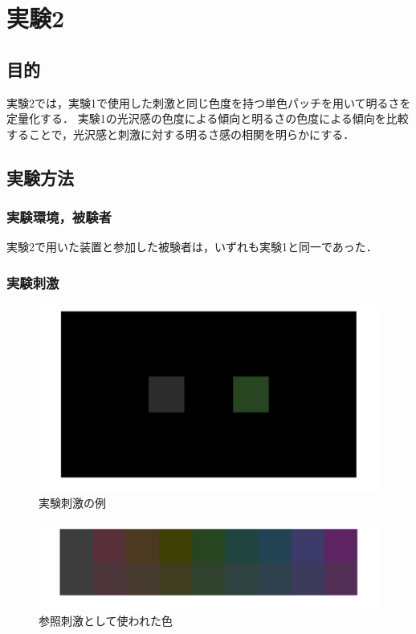 \chapter{実験2}

\section{目的}

    実験2では，実験1で使用した刺激と同じ色度を持つ単色パッチを用いて明るさを定量化する．
    実験1の光沢感の色度による傾向と明るさの色度による傾向を比較することで，光沢感と刺激に対する明るさ感の相関を明らかにする．


\section{実験方法}
    \subsection{実験環境，被験者}

        実験2で用いた装置と参加した被験者は，いずれも実験1と同一であった．

    \subsection{実験刺激}

        \begin{figure}[h]
            \centering
            \includegraphics[width=14.0cm]{./img/ex2_stimuli2.png}
            \caption{実験刺激の例}
            \label{ex1_procedure}
        \end{figure}

        \begin{figure}[h]
            \centering
            \includegraphics[width=14.0cm]{./img/patchStimuli.png}
            \caption{参照刺激として使われた色}
            \label{ex1_procedure}
        \end{figure}

